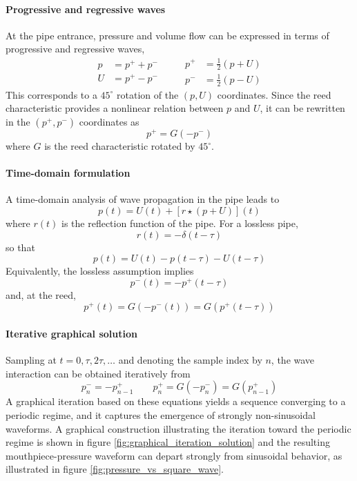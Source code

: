 \paragraph{Progressive and regressive waves} At the pipe entrance, pressure and volume flow can be expressed in terms of progressive and regressive waves,
\[
\begin{aligned}
p &= p^{+} + p^{-} \\
U &= p^{+} - p^{-}
\end{aligned}
\qquad
\begin{aligned}
p^{+} &= \frac{1}{2}(p + U) \\
p^{-} &= \frac{1}{2}(p - U)
\end{aligned}
\]
This corresponds to a \( 45^{\circ} \) rotation of the \((p,U)\) coordinates. Since the reed characteristic provides a nonlinear relation between \( p \) and \( U \), it can be rewritten in the \((p^{+},p^{-})\) coordinates as
\[
p^{+} = G(-p^{-})
\]
where \( G \) is the reed characteristic rotated by \( 45^{\circ} \).

\paragraph{Time-domain formulation} A time-domain analysis of wave propagation in the pipe leads to
\[
p(t) = U(t) + [r \star (p + U)](t)
\]
where \( r(t) \) is the reflection function of the pipe. For a lossless pipe,
\[
r(t) = -\delta(t - \tau)
\]
so that
\[
p(t) = U(t) - p(t - \tau) - U(t - \tau)
\]
Equivalently, the lossless assumption implies
\[
p^{-}(t) = -p^{+}(t - \tau)
\]
and, at the reed,
\[
p^{+}(t) = G(-p^{-}(t)) = G(p^{+}(t - \tau))
\]

\paragraph{Iterative graphical solution} Sampling at \( t = 0, \tau, 2\tau, \ldots \) and denoting the sample index by \( n \), the wave interaction can be obtained iteratively from
\[
p^{-}_{n} = -p^{+}_{n-1}
\qquad
p^{+}_{n} = G(-p^{-}_{n}) = G(p^{+}_{n-1})
\]
A graphical iteration based on these equations yields a sequence converging to a periodic regime, and it captures the emergence of strongly non-sinusoidal waveforms. A graphical construction illustrating the iteration toward the periodic regime is shown in figure \ref{fig:graphical_iteration_solution} and the resulting mouthpiece-pressure waveform can depart strongly from sinusoidal behavior, as illustrated in figure \ref{fig:pressure_vs_square_wave}.

